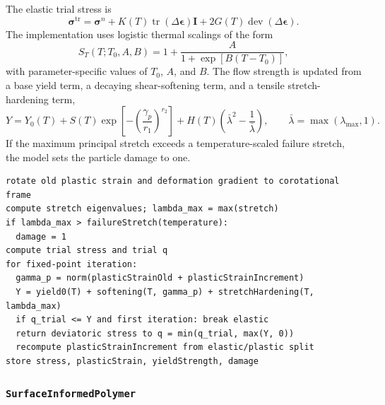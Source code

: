 The elastic trial stress is
\begin{equation}
  \boldsymbol{\sigma}^{\mathrm{tr}} = \boldsymbol{\sigma}^{n}
  + K(T)\operatorname{tr}(\Delta\boldsymbol{\epsilon})\mathbf{I}
  + 2G(T)\operatorname{dev}(\Delta\boldsymbol{\epsilon}).
\end{equation}
The implementation uses logistic thermal scalings of the form
\begin{equation}
  S_T(T;T_0,A,B)=1+\frac{A}{1+\exp[B(T-T_0)]},
  \label{eq:polymer-thermal-scale}
\end{equation}
with parameter-specific values of \(T_0\), \(A\), and \(B\).  The flow strength is updated from a base yield term, a decaying shear-softening term, and a tensile stretch-hardening term,
\begin{equation}
  Y = Y_0(T)
  + S(T)\exp\left[-\left(\frac{\gamma_p}{r_1}\right)^{r_2}\right]
  + H(T)\left(\bar{\lambda}^{2}-\frac{1}{\bar{\lambda}}\right),
  \qquad
  \bar{\lambda}=\max(\lambda_{\max},1).
  \label{eq:polymer-flow-strength}
\end{equation}
If the maximum principal stretch exceeds a temperature-scaled failure stretch, the model sets the particle damage to one.

\begin{lstlisting}[caption={StrainHardeningPolymer update structure.},label={alg:polymer-update},basicstyle=\ttfamily\small]
rotate old plastic strain and deformation gradient to corotational frame
compute stretch eigenvalues; lambda_max = max(stretch)
if lambda_max > failureStretch(temperature):
  damage = 1
compute trial stress and trial q
for fixed-point iteration:
  gamma_p = norm(plasticStrainOld + plasticStrainIncrement)
  Y = yield0(T) + softening(T, gamma_p) + stretchHardening(T, lambda_max)
  if q_trial <= Y and first iteration: break elastic
  return deviatoric stress to q = min(q_trial, max(Y, 0))
  recompute plasticStrainIncrement from elastic/plastic split
store stress, plasticStrain, yieldStrength, damage
\end{lstlisting}


\subsubsection{\texttt{SurfaceInformedPolymer}}
\label{subsubsec:surface-informed-polymer-model}

